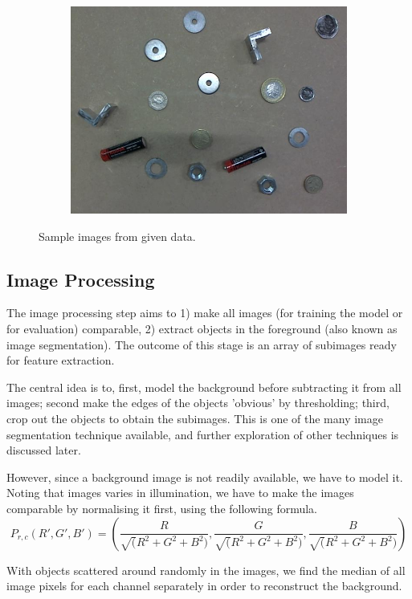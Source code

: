 \documentclass[main.tex]{subfiles}
\begin{document}
\begin{figure}[!h]
\begin{subfigure}[b]{.3\textwidth}
    \includegraphics[width=\textwidth]{./img/sample_fig/03.jpg}
  \end{subfigure}
  \caption{Sample images from given data.}
  \label{montage_data}
\end{figure}


\subsection{Image Processing}
The image processing step aims to 1) make all images (for training the model or for evaluation) comparable, 2) extract objects in the foreground (also known as image segmentation). The outcome of this stage is an array of subimages ready for feature extraction.

The central idea is to, first, model the background before subtracting it from all images; second make the edges of the objects 'obvious' by thresholding; third, crop out the objects to obtain the subimages. This is one of the many image segmentation technique available, and further exploration of other techniques is discussed later.

However, since a background image is not readily available, we have to model it. Noting that images varies in illumination, we have to make the images comparable by normalising it first, using the following formula.
$$ P_{r,c}(R',G',B')=(\frac{R}{\sqrt(R^2+G^2+B^2)},\frac{G}{\sqrt(R^2+G^2+B^2)},\frac{B}{\sqrt(R^2+G^2+B^2)})$$

With objects scattered around randomly in the images, we find the median of all image pixels for each channel separately in order to reconstruct the background.
\end{document}

